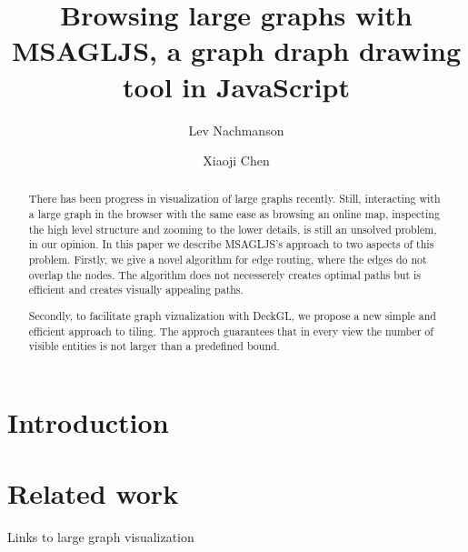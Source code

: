 \documentclass{gd-llncs}
\begin{document}
\title{Browsing large graphs with MSAGLJS, a graph draph drawing tool in JavaScript }
\author{%
  Lev Nachmanson  \and
  Xiaoji Chen
}%
\maketitle


\begin{abstract}
  There has been progress in visualization of large graphs recently. Still, interacting with a large graph in the browser with the same ease as browsing an online map, inspecting the high level structure and zooming to the lower details, is still an unsolved problem, in our opinion. In this paper we describe MSAGLJS's approach to two aspects of this problem. Firstly, we give a novel algorithm for edge routing, where the edges do not overlap the nodes. The algorithm does not necesserely creates optimal paths but is efficient and creates visually appealing paths.

  Secondly, to facilitate graph vizualization with DeckGL, we propose a new simple and efficient approach to tiling. The approch guarantees that in every view the number of visible entities is not larger than a predefined bound.
\end{abstract}


\section*{Introduction}

\label{sec:intro}
\section*{Related work}
Links to large graph visualization


\cite{graphexp}

\cite{graphviz}

\cite{regraph}

\cite{skewed}

\cite{circos}

\cite{gibson2013survey}
\end{document}
